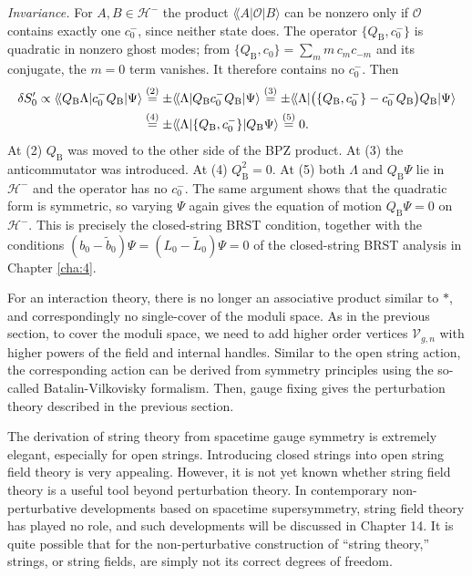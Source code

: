 \begin{tcolorbox}[breakable]
\begin{remark}
		\emph{Invariance.} For $A,B\in\mathscr H^-$ the product $\lAngle A|\mathcal O|B\rangle$ can be nonzero only if $\mathcal O$ contains exactly one $c_0^-$, since neither state does. The operator $\{Q_{\mathrm B},c_0^-\}$ is quadratic in nonzero ghost modes; from $\{Q_{\mathrm B},c_0\}=\sum_mm\,c_mc_{-m}$ and its conjugate, the $m=0$ term vanishes. It therefore contains no $c_0^-$. Then
		\begin{align*}
			\delta S_0'\propto\langle\!\langle Q_{\mathrm B}\Lambda|c_0^-Q_{\mathrm B}|\Psi\rangle
			&\overset{(2)}{=}\pm\langle\!\langle\Lambda|Q_{\mathrm B}c_0^-Q_{\mathrm B}|\Psi\rangle
			\overset{(3)}{=}\pm\langle\!\langle\Lambda|\bigl(\{Q_{\mathrm B},c_0^-\}-c_0^-Q_{\mathrm B}\bigr)Q_{\mathrm B}|\Psi\rangle\\
			&\overset{(4)}{=}\pm\langle\!\langle\Lambda|\{Q_{\mathrm B},c_0^-\}|Q_{\mathrm B}\Psi\rangle\overset{(5)}{=}0 .
		\end{align*}
		At (2) $Q_{\mathrm B}$ was moved to the other side of the BPZ product. At (3) the anticommutator was introduced. At (4) $Q_{\mathrm B}^2=0$. At (5) both $\Lambda$ and $Q_{\mathrm B}\Psi$ lie in $\mathscr H^-$ and the operator has no $c_0^-$. The same argument shows that the quadratic form is symmetric, so varying $\Psi$ again gives the equation of motion $Q_{\mathrm B}\Psi=0$ on $\mathscr H^-$. This is precisely the closed-string BRST condition, together with the conditions $(b_0-\tilde b_0)\Psi=(L_0-\tilde L_0)\Psi=0$ of the closed-string BRST analysis in Chapter \ref{cha:4}.
	\end{remark}
\end{tcolorbox}
For an interaction theory, there is no longer an associative product similar to $*$, and correspondingly no single-cover of the moduli space. 
As in the previous section, to cover the moduli space, we need to add higher order vertices $\mathscr{V}_{g, n}$ with higher powers of the field and internal handles. 
Similar to the open string action, the corresponding action can be derived from symmetry principles using the so-called Batalin-Vilkovisky formalism. Then, gauge fixing gives the perturbation theory described in the previous section.

The derivation of string theory from spacetime gauge symmetry is extremely elegant, especially for open strings. Introducing closed strings into open string field theory is very appealing. However, it is not yet known whether string field theory is a useful tool beyond perturbation theory. 
In contemporary non-perturbative developments based on spacetime supersymmetry, string field theory has played no role, and such developments will be discussed in Chapter 14.
It is quite possible that for the non-perturbative construction of ``string theory,'' strings, or string fields, are simply not its correct degrees of freedom.

